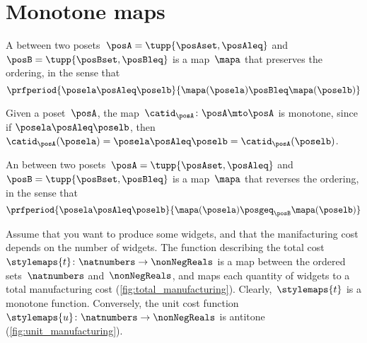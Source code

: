 
\section{Monotone maps}\label{sec:monotonicity-monotone-maps}


\begin{definition}
	\label{def:monotone}
	A \emph{} between two posets~$\posA=\tupp{\posAset, \posAleq}$ and~$\posB=\tupp{\posBset, \posBleq}$ is a map~$\mapa$ that preserves the ordering, in the sense that
	\begin{equation}
		\prfperiod{
			\posela \posAleq \poselb
		}{
			\mapa(\posela) \posBleq \mapa(\poselb)
		}
	\end{equation}
\end{definition}

\begin{remark}
	Given a poset~$\posA$, the map~$\catid_{\posA}\colon \posA \mto \posA$ is monotone, since if $\posela\posAleq \poselb$, then $\catid_{\posA}(\posela)=\posela \posAleq  \poselb =  \catid_{\posA}(\poselb )$.

\end{remark}

\begin{definition}
	\label{def:antitone}
	An \emph{} between two posets~$\posA=\tupp{\posAset, \posAleq}$ and~$\posB=\tupp{\posBset, \posBleq}$ is a map~$\mapa$ that reverses the ordering, in the sense that
	\begin{equation}
		\prfperiod{
			\posela \posAleq \poselb
		}{
			\mapa(\posela) \posgeq_\posB \mapa(\poselb)
		}
	\end{equation}
\end{definition}

\begin{example}
	Assume that you want to produce some widgets, and that the manifacturing cost depends on the number of widgets.
	The function describing the total cost~$\stylemaps{t}\colon \natnumbers\to \nonNegReals$ is a map between the ordered sets~$\natnumbers$ and~$\nonNegReals$, and maps each quantity of widgets to a total manufacturing cost (\cref{fig:total_manufacturing}).
	Clearly,~$\stylemaps{t}$ is a monotone function.
	Conversely, the unit cost function~$\stylemaps{u}\colon \natnumbers\to \nonNegReals$ is antitone (\cref{fig:unit_manufacturing}).
\end{example}

